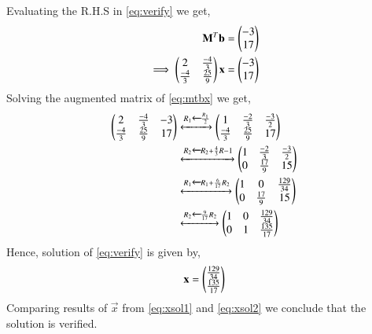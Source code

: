 \documentclass[journal,12pt,twocolumn]{IEEEtran}
\begin{document}
Evaluating the R.H.S in \eqref{eq:verify} we get,
\begin{align}
    \mathbf{M}^T\mathbf{b}&= \begin{pmatrix}-3\\17\end{pmatrix} \\
    \implies\begin{pmatrix}2&\frac{-4}{3}\\ \frac{-4}{3}& \frac{25}{9}\end{pmatrix}\mathbf{x}&= \begin{pmatrix}-3\\17\end{pmatrix} \label{eq:mtbx}
\end{align}
Solving the augmented matrix of \eqref{eq:mtbx} we get, 
\begin{align}
    \begin{pmatrix}2&\frac{-4}{3}&-3\\\frac{-4}{3}&\frac{25}{9}&17\end{pmatrix}&\xleftrightarrow{R_1\xleftarrow{}\frac{R_1}{2}} \begin{pmatrix}1&\frac{-2}{3}&\frac{-3}{2}\\ \frac{-4}{3}&\frac{25}{9}&17\end{pmatrix} \\
    &\xleftrightarrow{R_2\xleftarrow{}R_2+\frac{4}{3}R-1} \begin{pmatrix}1&\frac{-2}{3}&\frac{-3}{2}\\ 0&\frac{17}{9}&15\end{pmatrix}\\
    &\xleftrightarrow{R_1\xleftarrow{}R_1+\frac{6}{17}R_2} \begin{pmatrix}1&0&\frac{129}{34}\\0&\frac{17}{9}&15\end{pmatrix}\\
    &\xleftrightarrow{R_2\xleftarrow{}\frac{9}{17}R_2} \begin{pmatrix}1&0&\frac{129}{34}\\0&1&\frac{135}{17}\end{pmatrix}
\end{align}
Hence, solution of \eqref{eq:verify} is given by, 
\begin{align}\label{eq:xsol2}
    \mathbf{x}=\begin{pmatrix}\frac{129}{34} \\ \frac{135}{17}\end{pmatrix}
\end{align}
Comparing results of $\vec{x}$ from \eqref{eq:xsol1} and \eqref{eq:xsol2} we conclude that the solution is verified. 
\end{document}
